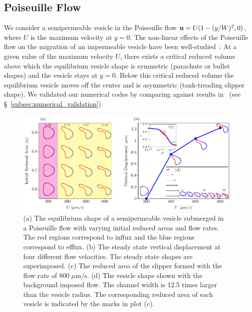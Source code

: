 \documentclass[prb,preprint,showpacs,preprintnumbers,amsmath,amssymb,longbibliography]{revtex4-1}
\newif\ifTikz
\begin{document}
\subsection{Poiseuille Flow}
We consider a semipermeable vesicle in the Poiseuille flow $\mathbf{u} =
U(1-(y/W)^2,0)$, where $U$ is the maximum velocity at $y=0$. The
non-linear effects of the Poiseuille flow on the migration of an
impermeable vesicle have been well-studied~\cite{kao-bir-mis2009}: At a
given value of the maximum velocity $U$, there exists a critical reduced
volume above which the equilibrium vesicle shape is symmetric (parachute
or bullet shapes) and the vesicle stays at $y=0$. Below this critical
reduced volume the equilibrium vesicle moves off the center and is
asymmetric (tank-treading slipper shape). We validated our numerical
codes by comparing against results in~\citet{kao-bir-mis2009} (see
\S~\ref{subsec:numerical_validation}).

\begin{figure}[htp]
  \centering
  \ifTikz
  
  \else
  \includegraphics{figures/parabolicComposite.pdf}
  \fi
  \caption{\label{fig:parabolicComposite} (a) The equilibrium shape of
  a semipermeable vesicle submerged in a Poiseuille flow with varying
  initial reduced areas and flow rates. The red regions correspond to
  influx and the blue regions correspond to efflux. (b) The steady
  state vertical displacement at four different flow velocities. The
  steady state shapes are superimposed. (c) The reduced area of the
  slipper formed with the flow rate of $800 \; \mu$m/s. (d) The vesicle
  shape shown with the background imposed flow. The channel width is
  12.5 times larger than the vesicle radius. The corresponding reduced
  area of each vesicle is indicated by the marks in plot (c).}
\end{figure}
\end{document}
